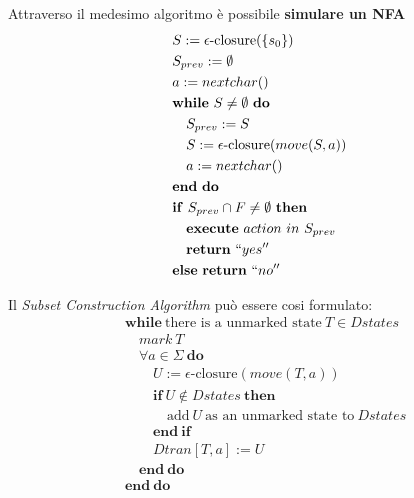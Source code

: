 Attraverso il medesimo algoritmo è possibile \textbf{simulare un NFA}
\begin{align*}
& S := \epsilon\text{-closure}(\{s_0\})                        \\
& S_{prev} := \emptyset                                        \\
& a := nextchar()                                              \\
& \mathbf{while} \ S \neq \emptyset \ \mathbf{do}              \\
& \quad S_{prev} := S                                          \\
& \quad S := \epsilon\text{-closure}(move(S,a))                \\
& \quad a := nextchar()                                        \\
& \mathbf{end \ do}                                            \\
& \mathbf{if} \ S_{prev} \cap F \neq \emptyset \ \mathbf{then} \\
& \quad \mathbf{execute} \ action \ in \ S_{prev}              \\
& \quad \mathbf{return} \ ``yes''                              \\
& \mathbf{else \ return} \ ``no''
\end{align*}

Il \textit{Subset Construction Algorithm} può essere cosi formulato:
\begin{align*}
& \mathbf{while} \ \text{there is a unmarked state} \ T \in Dstates      \\
& \quad mark \ T                                                         \\
& \quad \forall a \in \Sigma \ \mathbf{do}                               \\
& \qquad U := \epsilon\text{-closure}(move(T,a))                         \\
& \qquad \mathbf{if} \ U \notin Dstates \ \mathbf{then}                  \\
& \qquad \quad \text{add} \ U \ \text{as an unmarked state to} \ Dstates \\
& \qquad \mathbf{end \ if}                                               \\
& \qquad Dtran[T,a] := U                                                 \\
& \quad \mathbf{end \ do}                                                \\
& \mathbf{end \ do}
\end{align*}

